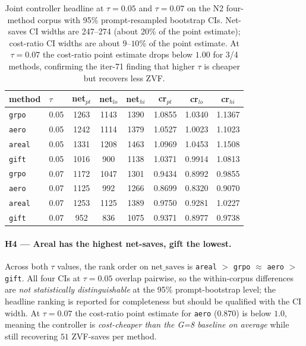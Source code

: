 \begin{table}[t]
\centering\small
\caption{Joint controller headline at $\tau{=}0.05$ and $\tau{=}0.07$
on the N2 four-method corpus with 95\% prompt-resampled bootstrap
CIs.  Net-saves CI widths are 247--274 (about 20\% of the point
estimate); cost-ratio CI widths are about $9$--$10$\% of the point
estimate.  At $\tau{=}0.07$ the cost-ratio point estimate drops
below $1.00$ for 3/4 methods, confirming the iter-71 finding that
higher $\tau$ is cheaper but recovers less ZVF.}
\label{tab:p7-joint-ci}
\begin{tabular}{llcccccc}
\toprule
method & $\tau$ & net$_{pt}$ & net$_{lo}$ & net$_{hi}$ & cr$_{pt}$ & cr$_{lo}$ & cr$_{hi}$ \\
\midrule
\texttt{grpo}  & 0.05 & 1263 & 1143 & 1390 & 1.0855 & 1.0340 & 1.1367 \\
\texttt{aero}  & 0.05 & 1242 & 1114 & 1379 & 1.0527 & 1.0023 & 1.1023 \\
\texttt{areal} & 0.05 & 1331 & 1208 & 1463& 1.0969 & 1.0453 & 1.1508 \\
\texttt{gift}  & 0.05 & 1016 &  900 & 1138 & 1.0371 & 0.9914 & 1.0813 \\
\midrule
\texttt{grpo}  & 0.07 & 1172 & 1047 & 1301 & 0.9434 & 0.8992 & 0.9855 \\
\texttt{aero}  & 0.07 & 1125 &  992 & 1266 & 0.8699 & 0.8320 & 0.9070 \\
\texttt{areal} & 0.07 & 1253 & 1125 & 1389 & 0.9750 & 0.9281 & 1.0227 \\
\texttt{gift}  & 0.07 &  952 &  836 & 1075 & 0.9371 & 0.8977 & 0.9738 \\
\bottomrule
\end{tabular}
\end{table}

\paragraph{H4 --- Areal has the highest net-saves, gift the lowest.}
Across both $\tau$ values, the rank order on $\mathrm{net\_saves}$
is \texttt{areal} $>$ \texttt{grpo} $\approx$ \texttt{aero} $>$
\texttt{gift}.  All four CIs at $\tau{=}0.05$ overlap pairwise, so
the within-corpus differences are \emph{not statistically
distinguishable} at the 95\% prompt-bootstrap level; the headline
ranking is reported for completeness but should be qualified with
the CI width.  At $\tau{=}0.07$ the cost-ratio point estimate for
\texttt{aero} ($0.870$) is below $1.0$, meaning the controller is
\emph{cost-cheaper than the G=8 baseline on average} while still
recovering $51$ ZVF-saves per method.

